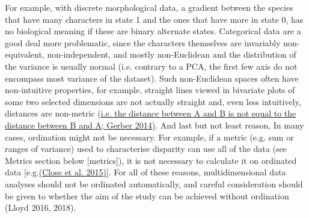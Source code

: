 For example, with discrete morphological data, a gradient between the species that have many characters in state 1 and the ones that have more in state 0, has no biological meaning if these are binary alternate states.
Categorical data are a good deal more problematic, since the characters themselves are invariably non-equivalent, non-independent, and mostly non-Euclidean and the distribution of the variance is usually normal (i.e. contrary to a PCA, the first few axis do not encompass most variance of the dataset).
Such non-Euclidean spaces often have non-intuitive properties, for example, straight lines viewed in bivariate plots of some two selected dimensions are not actually straight and, even less intuitively, distances are non-metric (\href{https://paperpile.com/c/sTGYvp/SJbC}{i.e. the distance between A and B is not equal to the distance between B and A; Gerber 2014)}.
And last but not least reason, In many cases, ordination might not be necessary.
For example, if a metric (e.g. sum or ranges of variance) used to characterise disparity can use all of the data (see Metrics section below {[}metrics{]}), it is not necessary to calculate it on ordinated data {[}e.g.\href{https://paperpile.com/c/sTGYvp/PbSx}{(Close et al. 2015)}{]}.
For all of these reasons, multidimensional data analyses should not be ordinated automatically, and careful consideration should be given to whether the aim of the study can be achieved without ordination (Lloyd 2016, 2018).











